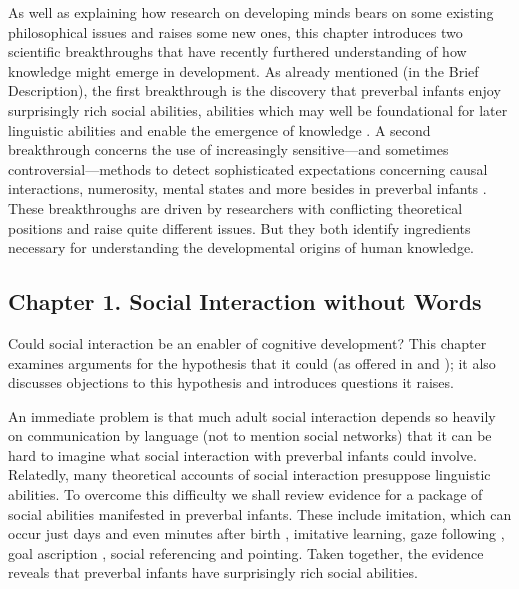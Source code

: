 \documentclass[12pt,\papersize]{extarticle}
\begin{document}
As well as explaining how research on developing minds bears on some existing philosophical issues and raises some new ones,
this chapter introduces two scientific breakthroughs that have recently furthered understanding of how knowledge might emerge in development.
As already mentioned (in the Brief Description), the first breakthrough is the discovery that preverbal infants enjoy surprisingly rich social abilities, abilities which
may well be foundational for later linguistic abilities and enable the emergence of knowledge \citep[e.g.][]{Csibra:2009xr,Meltzoff:2007pj,Tomasello:2005wx}. 
A second breakthrough concerns the use of increasingly sensitive---and sometimes controversial---methods to detect  sophisticated expectations concerning  causal interactions, numerosity, mental states and more besides in preverbal infants \citep[e.g.][]{Spelke:1990jn,Baillargeon:gx}.
These breakthroughs are driven by researchers with conflicting theoretical positions and raise quite different issues.  
But they both  identify ingredients necessary for understanding the developmental origins of human knowledge.



\subsection{Chapter 1. Social Interaction without Words}
Could social interaction be an enabler of cognitive development? 
This chapter examines arguments for the hypothesis that it could
 (as offered in \citealp{Tomasello:2003tq} and \citealp{Moll:2007gu}); it also discusses objections to this hypothesis and introduces questions it raises.
 
An immediate problem is that much adult social interaction depends so heavily on communication by language (not to mention social networks) that it can be hard to imagine what social interaction with preverbal infants could involve.
Relatedly, many theoretical accounts of social interaction presuppose linguistic abilities.
To overcome this difficulty we shall review evidence for a package of social abilities manifested in preverbal infants.
These include imitation, which can occur just days and even minutes after birth \citep{meltzoff:1977_imitation,field:1982_imitation,meltzoff:1983_newborn}, 
imitative learning, 
gaze following \citep{Csibra:2008be},
goal ascription \citep{Gergely:1995sq,Woodward:2000jw},
social referencing \citep{Baldwin:2000qq} 
and 
pointing. 
Taken together, the evidence reveals that preverbal infants have surprisingly rich social abilities.
\end{document}
